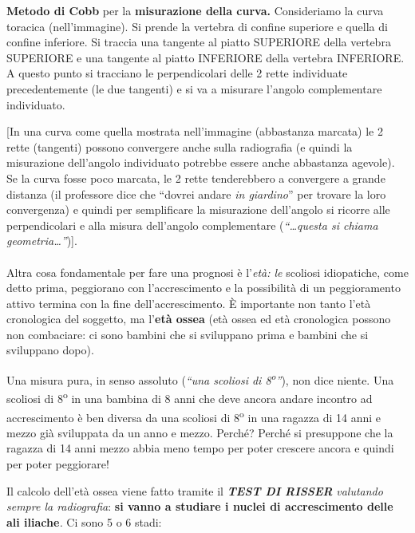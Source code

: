 \textbf{Metodo di Cobb} per la \textbf{misurazione della curva.}
Consideriamo la curva toracica (nell'immagine). Si prende la vertebra di
confine superiore e quella di confine inferiore. Si traccia una tangente
al piatto SUPERIORE della vertebra SUPERIORE e una tangente al piatto
INFERIORE della vertebra INFERIORE. A questo punto si tracciano le
perpendicolari delle 2 rette individuate precedentemente (le due
tangenti) e si va a misurare l'angolo complementare individuato.

{[}In una curva come quella mostrata nell'immagine (abbastanza marcata)
le 2 rette (tangenti) possono convergere anche sulla radiografia (e
quindi la misurazione dell'angolo individuato potrebbe essere anche
abbastanza agevole). Se la curva fosse poco marcata, le 2 rette
tenderebbero a convergere a grande distanza (il professore dice che
``dovrei andare \emph{in giardino}'' per trovare la loro convergenza) e
quindi per semplificare la misurazione dell'angolo si ricorre alle
perpendicolari e alla misura dell'angolo complementare
(\emph{``\ldots{}questa si chiama geometria\ldots{}''}){]}.
\\\\
Altra cosa fondamentale per fare una prognosi è l'\emph{età: le}
scoliosi idiopatiche, come detto prima, peggiorano con l'accrescimento e
la possibilità di un peggioramento attivo termina con la fine
dell'accrescimento. È importante non tanto l'età cronologica del
soggetto, ma l'\textbf{età ossea} (età ossea ed età cronologica possono
non combaciare: ci sono bambini che si sviluppano prima e bambini che si
sviluppano dopo).

Una misura pura, in senso assoluto (\emph{``una scoliosi di 8\textsuperscript{o}''}), non
dice niente. Una scoliosi di 8\textsuperscript{o} in una bambina di 8 anni che deve ancora
andare incontro ad accrescimento è ben diversa da una scoliosi di 8\textsuperscript{o} in
una ragazza di 14 anni e mezzo già sviluppata da un anno e mezzo.
Perché? Perché si presuppone che la ragazza di 14 anni mezzo abbia meno
tempo per poter crescere ancora e quindi per poter peggiorare!

Il calcolo dell'età ossea viene fatto tramite il \emph{\textbf{TEST DI
RISSER}} \emph{valutando sempre la radiografia}: \textbf{si vanno a
studiare i nuclei di accrescimento delle ali iliache}\emph{.} Ci sono 5
o 6 stadi:

